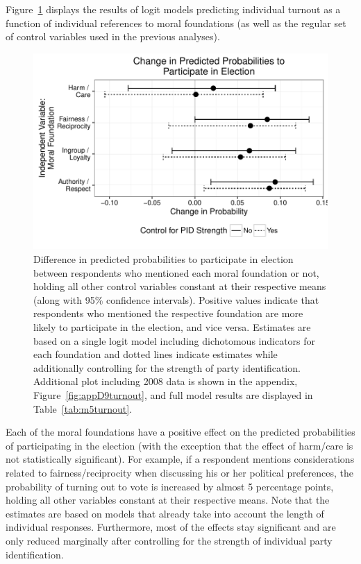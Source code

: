 \documentclass[12pt]{article}
\begin{document}
Figure~\ref{fig:5turnout} displays the results of logit models predicting individual turnout as a function of individual references to moral foundations (as well as the regular set of control variables used in the previous analyses).

\begin{figure}[h]\centering
\includegraphics[scale=.9]{../calc/fig/fig5turnout.pdf}
\caption{Difference in predicted probabilities to participate in election between respondents who mentioned each moral foundation or not, holding all other control variables constant at their respective means (along with 95\% confidence intervals). Positive values indicate that respondents who mentioned the respective foundation are more likely to participate in the election, and vice versa. Estimates are based on a single logit model including dichotomous indicators for each foundation and dotted lines indicate estimates while additionally controlling for the strength of party identification. Additional plot including 2008 data is shown in the appendix, Figure~\ref{fig:appD9turnout}, and full model results are displayed in Table~\ref{tab:m5turnout}.}\label{fig:5turnout}
\end{figure}

Each of the moral foundations have a positive effect on the predicted probabilities of participating in the election (with the exception that the effect of harm/care is not statistically significant). For example, if a respondent mentions considerations related to fairness/reciprocity when discussing his or her political preferences, the probability of turning out to vote is increased by almost 5 percentage points, holding all other variables constant at their respective means. Note that the estimates are based on models that already take into account the length of individual responses. Furthermore, most of the effects stay significant and are only reduced marginally after controlling for the strength of individual party identification.
\end{document}
